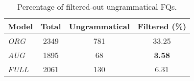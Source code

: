 \begin{table}[!t]
    \centering
    \small
    \setlength{\tabcolsep}{6pt} %
    \begin{tabular}{lccc}
        \toprule
        \textbf{Model} & \textbf{Total} & \textbf{Ungrammatical} & \textbf{Filtered (\%)} \\
        \midrule
        \textit{ORG}  & 2349 & 781  & 33.25  \\
        \textit{AUG}  & 1895 & 68   & \textbf{3.58}   \\
        \textit{FULL} & 2061 & 130  & 6.31   \\
        \bottomrule
    \end{tabular}
    \caption{Percentage of filtered-out ungrammatical FQs.}
    \label{tab:filtered}
\end{table}
